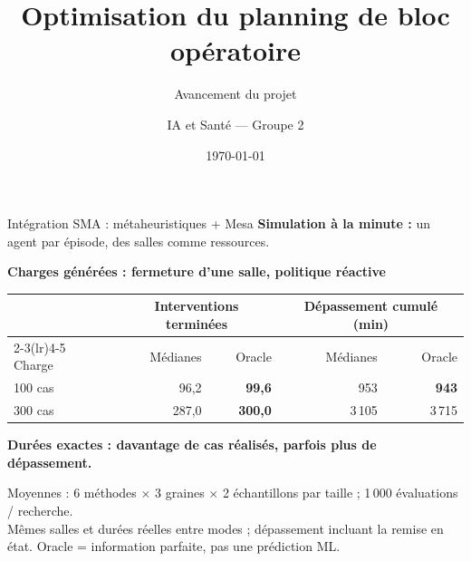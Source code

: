 \documentclass[aspectratio=169,11pt]{beamer}
\title[Optimisation blocs]{Optimisation du planning de bloc opératoire}
\subtitle{Avancement du projet}
\author{IA et Sant\'e --- Groupe 2}
\date{\today}
\begin{document}
\begin{frame}
  \titlepage
\end{frame}

\begin{frame}[t]{Intégration SMA : métaheuristiques + Mesa}
	\small
	\centering
	\textbf{Simulation à la minute :} un agent par épisode, des salles comme ressources.
	
	\vspace{3pt}
	
	\vspace{-3pt}
	{\scriptsize\textbf{Charges générées : fermeture d'une salle, politique réactive}}
	\vspace{2pt}
	
	{\scriptsize
		\setlength{\tabcolsep}{11pt}
		\begin{tabular}{lrrrr}
			\toprule
			& \multicolumn{2}{c}{Interventions terminées}
			& \multicolumn{2}{c}{Dépassement cumulé (min)} \\
			\cmidrule(lr){2-3}\cmidrule(lr){4-5}
			Charge & Médianes & Oracle & Médianes & Oracle \\
			\midrule
			100 cas & 96{,}2 & \textbf{99{,}6} & 953 & \textbf{943} \\
			300 cas & 287{,}0 & \textbf{300{,}0} & 3\,105 & 3\,715 \\
			\bottomrule
	\end{tabular}}
	
	\vspace{4pt}
	{\small\color{mcmPrimary}\textbf{Durées exactes : davantage de cas réalisés, parfois plus de dépassement.}}
	
	\vspace{3pt}
	{\tiny Moyennes : 6 méthodes $\times$ 3 graines $\times$ 2 échantillons par taille ;
		1\,000 évaluations / recherche.\\
		Mêmes salles et durées réelles entre modes ; dépassement incluant la remise en état.
		Oracle = information parfaite, pas une prédiction ML.}
\end{frame}
\end{document}
